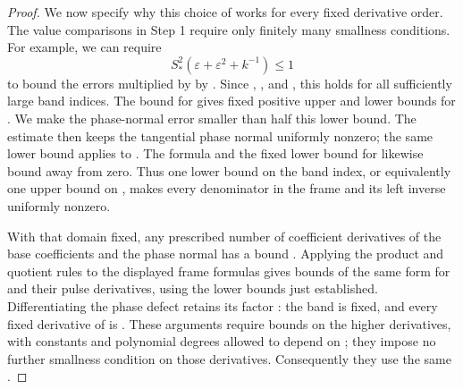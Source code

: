 \begin{proof}
We now specify why this choice of  works for every fixed derivative order. The value
comparisons in Step 1 require only finitely many smallness conditions. For example, we can
require
\[
S_*^2(\varepsilon+\varepsilon^2+k^{-1})\leq1
\]
to bound the errors multiplied by  by . Since , , and
, this holds for all sufficiently large band indices. The bound  for 
gives fixed positive upper and lower bounds for . We make the phase-normal error smaller
than half this lower bound. The estimate  then keeps the tangential
phase normal uniformly nonzero; the same lower bound applies to . The formula
 and the fixed lower bound for  likewise bound  away from
zero. Thus one lower bound on the band index, or equivalently one upper bound  on ,
makes every denominator in the frame and its left inverse uniformly nonzero.

With that domain fixed, any prescribed number of coefficient derivatives of the base
coefficients and the phase normal  has a bound . Applying the product and quotient
rules to the displayed frame formulas gives bounds of the same form for  and
their pulse derivatives, using the lower bounds just established. Differentiating the phase
defect retains its factor : the band is fixed, and every fixed derivative of  is . These
arguments require bounds on the higher derivatives, with constants and polynomial degrees
allowed to depend on ; they impose no further smallness condition on those derivatives.
Consequently they use the same .
\end{proof}

